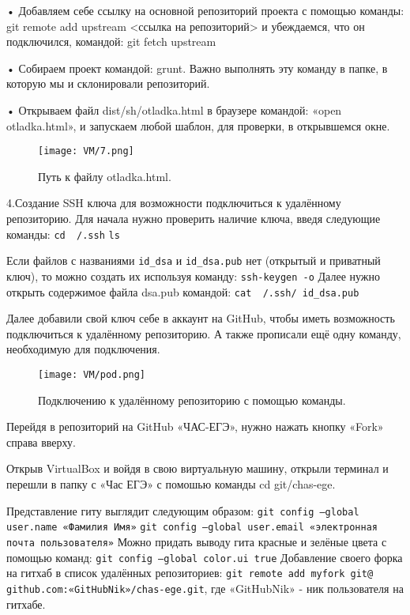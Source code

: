 • Добавляем себе ссылку на основной репозиторий проекта с помощью команды: git remote add upstream <ссылка на репозиторий> и убеждаемся, что он подключился, командой: git fetch upstream 

• Собираем проект командой: grunt. Важно выполнять эту команду в папке, в которую мы и склонировали репозиторий.

• Открываем файл dist/sh/otladka.html в браузере командой: «open otladka.html», и запускаем любой шаблон, для проверки, в открывшемся окне.


\begin{figure}[h]
		\centering
		\texttt{[image: VM/7.png]}
\caption{Путь к файлу otladka.html.}
\label{ris:image}
\end{figure}








4.\quad  Создание SSH ключа для возможности подключиться к удалённому репозиторию.
Для начала нужно проверить наличие ключа, введя следующие команды:
\newline \texttt{cd ~/.ssh}
\newline \texttt{ls}

Если файлов с названиями \texttt{id\_dsa} и \texttt{id\_dsa.pub} нет (открытый и приватный ключ), то можно создать их используя команду:
\newline  \texttt{ssh-keygen -o}
\newline \quad Далее нужно открыть содержимое файла dsa.pub командой:
\newline  \texttt{cat ~/.ssh/ id\_dsa.pub}

Далее добавили свой ключ себе в аккаунт на GitHub, чтобы иметь возможность подключиться к удалённому репозиторию. А также прописали ещё одну команду, необходимую для подключения.

\begin{figure}[h]
		\centering
		\texttt{[image: VM/pod.png]}
\caption{Подключению к удалённому репозиторию с помощью команды.}
\label{ris:image}
\end{figure}

Перейдя в репозиторий на GitHub «ЧАС-ЕГЭ», нужно нажать кнопку «Fork» справа вверху.

Открыв VirtualBox и войдя в свою виртуальную машину, открыли терминал и перешли в папку с «Час ЕГЭ» с помошью команды cd git/chas-ege.

Представление гиту выглядит следующим образом:
\newline \texttt{git config --global user.name «Фамилия Имя»}
\newline \texttt{git config --global user.email «электронная почта пользователя»}
\newline Можно придать выводу гита красные и зелёные цвета с помощью команд:
\texttt{git config --global color.ui true}
\newline Добавление своего форка на гитхаб в список удалённых репозиториев:
\texttt{git remote add myfork git@ github.com:«GitHubNik»/chas-ege.git}, где «GitHubNik» - ник пользователя на гитхабе. 

